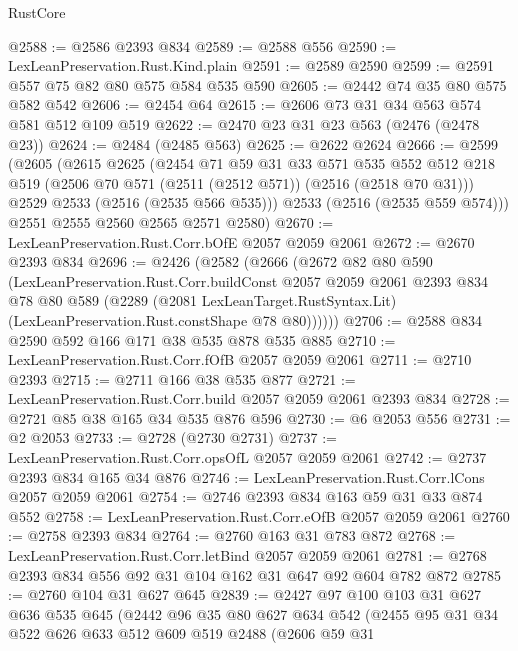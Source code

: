 \begin{lexlean}{RustCore}
\begin{coremodule}
@2588 := @2586 @2393 @834
@2589 := @2588 @556
@2590 := LexLeanPreservation.Rust.Kind.plain
@2591 := @2589 @2590
@2599 := @2591 @557 @75 @82 @80 @575 @584 @535 @590
@2605 := @2442 @74 @35 @80 @575 @582 @542
@2606 := @2454 @64
@2615 := @2606 @73 @31 @34 @563 @574 @581 @512 @109 @519
@2622 := @2470 @23 @31 @23 @563 (@2476 (@2478 @23))
@2624 := @2484 (@2485 @563)
@2625 := @2622 @2624
@2666 := @2599
    (@2605
      (@2615
        @2625
        (@2454
          @71
          @59
          @31
          @33
          @571
          @535
          @552
          @512
          @218
          @519
          (@2506 @70 @571 (@2511 (@2512 @571)) (@2516 (@2518 @70 @31)))
          @2529
          @2533
          (@2516 (@2535 @566 @535)))
        @2533
        (@2516 (@2535 @559 @574)))
      @2551
      @2555
      @2560
      @2565
      @2571
      @2580)
@2670 := LexLeanPreservation.Rust.Corr.bOfE @2057 @2059 @2061
@2672 := @2670 @2393 @834
@2696 := @2426
    (@2582
      (@2666
        (@2672
          @82
          @80
          @590
          (LexLeanPreservation.Rust.Corr.buildConst
            @2057
            @2059
            @2061
            @2393
            @834
            @78
            @80
            @589
            (@2289
              (@2081 LexLeanTarget.RustSyntax.Lit)
              (LexLeanPreservation.Rust.constShape @78 @80))))))
@2706 := @2588 @834 @2590 @592 @166 @171 @38 @535 @878 @535 @885
@2710 := LexLeanPreservation.Rust.Corr.fOfB @2057 @2059 @2061
@2711 := @2710 @2393
@2715 := @2711 @166 @38 @535 @877
@2721 := LexLeanPreservation.Rust.Corr.build @2057 @2059 @2061 @2393 @834
@2728 := @2721 @85 @38 @165 @34 @535 @876 @596
@2730 := @6 @2053 @556
@2731 := @2 @2053
@2733 := @2728 (@2730 @2731)
@2737 := LexLeanPreservation.Rust.Corr.opsOfL @2057 @2059 @2061
@2742 := @2737 @2393 @834 @165 @34 @876
@2746 := LexLeanPreservation.Rust.Corr.lCons @2057 @2059 @2061
@2754 := @2746 @2393 @834 @163 @59 @31 @33 @874 @552
@2758 := LexLeanPreservation.Rust.Corr.eOfB @2057 @2059 @2061
@2760 := @2758 @2393 @834
@2764 := @2760 @163 @31 @783 @872
@2768 := LexLeanPreservation.Rust.Corr.letBind @2057 @2059 @2061
@2781 := @2768 @2393 @834 @556 @92 @31 @104 @162 @31 @647 @92 @604 @782 @872
@2785 := @2760 @104 @31 @627 @645
@2839 := @2427
    @97
    @100
    @103
    @31
    @627
    @636
    @535
    @645
    (@2442
      @96
      @35
      @80
      @627
      @634
      @542
      (@2455
        @95
        @31
        @34
        @522
        @626
        @633
        @512
        @609
        @519
        @2488
        (@2606
          @59
          @31

\end{coremodule}
\end{lexlean}

